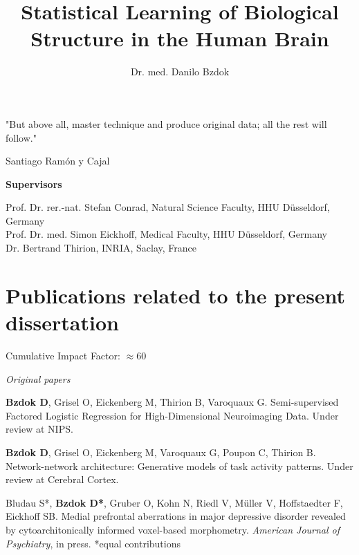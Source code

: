 \documentclass[authoryear,review,3p]{elsarticle}
\begin{document}
\begin{frontmatter}

\title{Statistical Learning of Biological Structure in the Human Brain}

\author{Dr. med. Danilo Bzdok}

\end{frontmatter}

\bigskip
\bigskip
\bigskip
\centerline{
"But above all, master technique and produce original data; 
all the rest will follow."}
\centerline{Santiago Ram\'{o}n y Cajal}

\bigskip
\bigskip
\bigskip

\textbf{Supervisors\\}

Prof. Dr. rer.-nat. Stefan Conrad, Natural Science Faculty, HHU D\"usseldorf, Germany\\

Prof. Dr. med. Simon Eickhoff, Medical Faculty, HHU D\"usseldorf, Germany\\

Dr. Bertrand Thirion, INRIA, Saclay, France\\





\bigskip

\newpage
\section*{Publications related to the present dissertation}

\linebreak
Cumulative Impact Factor: $\approx$60

\linebreak
\textit{Original papers}

\textbf{Bzdok D}, Grisel O, Eickenberg M, Thirion B, Varoquaux G.
Semi-supervised Factored Logistic Regression for High-Dimensional
Neuroimaging Data. Under review at NIPS.

\textbf{Bzdok D}, Grisel O, Eickenberg M, Varoquaux G, Poupon C, Thirion B.
Network-network architecture: Generative models of task activity patterns.
Under review at Cerebral Cortex.

Bludau S*, \textbf{Bzdok D*}, Gruber O,
Kohn N, Riedl V, Müller V, Hoffstaedter F, Eickhoff SB.
Medial prefrontal aberrations in major depressive disorder
revealed by cytoarchitonically informed voxel-based morphometry.
\textit{American Journal of Psychiatry}, in press. *equal contributions
\end{document}
